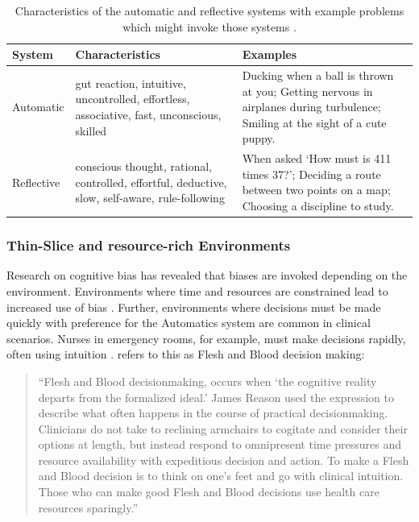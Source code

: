 \documentclass[a4paper]{scrartcl}     %
\begin{document}
      \begin{table}[htb]
        \caption{Characteristics of the automatic and reflective systems with example problems which might invoke those systems \citep{Thaler2012}.}
        \renewcommand{\arraystretch}{1.5}
        \begin{tabu}{X[0.6,l] X[2,p] X[2,p]}
        \toprule
        System & Characteristics & Examples \\
        \midrule
        Automatic
          & gut reaction, intuitive, uncontrolled, effortless, associative, fast, unconscious, skilled
          & Ducking when a ball is thrown at you; Getting nervous in airplanes during turbulence; Smiling at the sight of a cute puppy. \\

        Reflective
          & conscious thought, rational, controlled, effortful, deductive, slow, self-aware, rule-following
          & When asked `How must is 411 times 37?'; Deciding a route between two points on a map; Choosing a discipline to study. \\
        \bottomrule
        \end{tabu}
        \label{table:thaler}
      \end{table}






    \subsubsection{Thin-Slice and resource-rich Environments}\label{sec:background:biases:scenarios}

      Research on cognitive bias has revealed that biases are invoked depending on the environment. Environments where time and resources are constrained lead to increased use of bias \citep{Kahneman2012}. Further, environments where decisions must be made quickly with preference for the Automatics system are common in clinical scenarios. Nurses in emergency rooms, for example, must make decisions rapidly, often using intuition \citep{Cioffi1997}. \citet{Croskerry2005} refers to this as Flesh and Blood decision making:
      \begin{quote}
        ``Flesh and Blood decisionmaking, occurs when `the cognitive reality departs from the formalized ideal.' James Reason used the expression to describe what often happens in the course of practical decisionmaking. Clinicians do not take to reclining armchairs to cogitate and consider their options at length, but instead respond to omnipresent time pressures and resource availability with expeditious decision and action. To make a Flesh and Blood decision is to think on one's feet and go with clinical intuition. Those who can make good Flesh and Blood decisions use health care resources sparingly.''  \citep{Croskerry2005}
      \end{quote}
\end{document}
